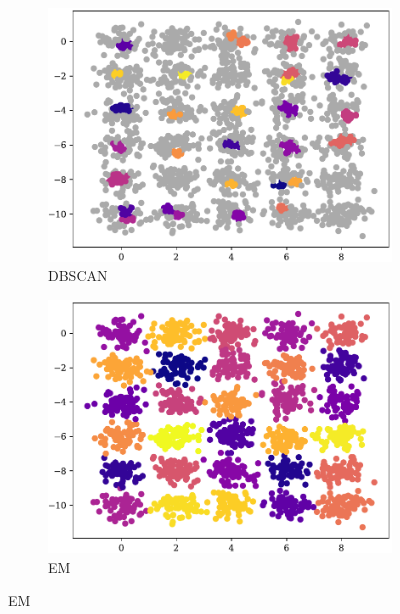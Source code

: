 \begin{figure}[t!]
    \begin{subfigure}[b]{0.45\textwidth}
        \includegraphics[width=\textwidth]{../plots/30-30_pred_dbscan.pdf}
        \caption{DBSCAN}
        \label{subfig:30-30-dbscan}
    \end{subfigure}
    \hspace{0.09\textwidth}
    \begin{subfigure}[b]{0.45\textwidth}
        \includegraphics[width=\textwidth]{../plots/30-30_pred_em.pdf}
        \caption{EM}
        \label{subfig:30-30-em}
    \end{subfigure}
\end{figure}
